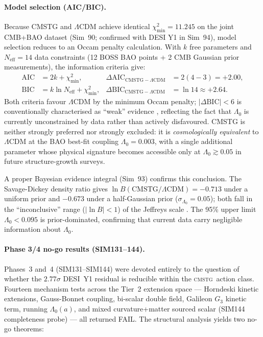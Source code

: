 \documentclass[12pt,a4paper]{article}
\newcommand{\CMSTG}{\textsc{cmstg}}
\begin{document}
\paragraph{Model selection (AIC/BIC).}
Because CMSTG and $\Lambda$CDM achieve identical $\chi^2_{\min} = 11.245$ on the joint
CMB+BAO dataset (Sim~90; confirmed with DESI Y1 in Sim~94), model selection reduces
to an Occam penalty calculation.  With $k$ free parameters and
$N_{\mathrm{eff}} = 14$ data constraints (12 BOSS BAO points + 2 CMB Gaussian prior
measurements), the information criteria give:
\begin{align}
  \mathrm{AIC} &= 2k + \chi^2_{\min}, & \Delta\mathrm{AIC}_{\mathrm{CMSTG}-\Lambda\mathrm{CDM}} &= 2(4-3) = +2.00, \\
  \mathrm{BIC} &= k\ln N_{\mathrm{eff}} + \chi^2_{\min}, & \Delta\mathrm{BIC}_{\mathrm{CMSTG}-\Lambda\mathrm{CDM}} &= \ln 14 \approx +2.64.
\end{align}
Both criteria favour $\Lambda$CDM by the minimum Occam penalty; $|\Delta\mathrm{BIC}| < 6$
is conventionally characterised as ``weak'' evidence \citep{Jeffreys1961}, reflecting the
fact that $\Lambda_0$ is currently unconstrained by data rather than actively
disfavoured. CMSTG is neither strongly preferred nor strongly excluded: it is
\emph{cosmologically equivalent} to $\Lambda$CDM at the BAO best-fit coupling
$\Lambda_0 = 0.003$, with a single additional parameter whose physical signature
becomes accessible only at $\Lambda_0 \gtrsim 0.05$ in future structure-growth surveys.

A proper Bayesian evidence integral (Sim~93) confirms this conclusion.  The
Savage-Dickey density ratio gives $\ln B(\mathrm{CMSTG}/\Lambda\mathrm{CDM}) = -0.713$
under a uniform prior and $-0.673$ under a half-Gaussian prior
($\sigma_{\Lambda_0} = 0.05$); both fall in the ``inconclusive'' range
($|\ln B| < 1$) of the Jeffreys scale \citep{Jeffreys1961}.
The 95\% upper limit $\Lambda_0 < 0.095$ is prior-dominated, confirming
that current data carry negligible information about $\Lambda_0$.

\paragraph{Phase 3/4 no-go results (SIM131--144).}
Phases~3 and~4 (SIM131--SIM144) were devoted entirely to the question of whether
the $2.77\sigma$ DESI~Y1 residual is reducible within the \CMSTG\ action class.
Fourteen mechanism tests across the Tier~2 extension space --- Horndeski kinetic
extensions, Gauss-Bonnet coupling, bi-scalar double field, Galileon $G_3$ kinetic
term, running $\Lambda_0(a)$, and mixed curvature+matter sourced scalar (SIM144
completeness probe) --- all returned FAIL.  The structural analysis yields two
no-go theorems:
\end{document}
